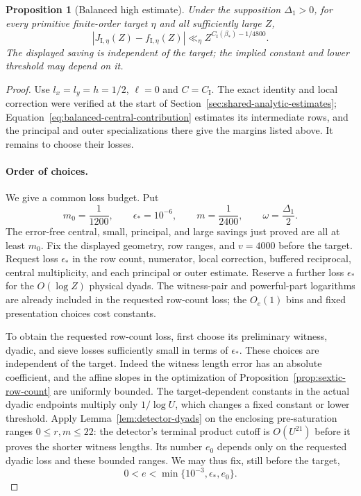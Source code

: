\documentclass[11pt,a4paper]{article}
\numberwithin{equation}{section}
\numberwithin{figure}{section}
\newtheorem{proposition}[theorem]{Proposition}
\theoremstyle{definition}
\theoremstyle{remark}
\begin{document}
\begin{proposition}[Balanced high estimate]
\label{prop:balanced-high}
Under the supposition $\Delta_1>0$, for every primitive finite-order target
$\eta$ and all sufficiently large $Z$,
\[
 |J_{\mathrm I,\eta}(Z)-f_{\mathrm I,\eta}(Z)|
 \ll_\eta Z^{C_{\mathrm I}(\beta_*)-1/4800}.
\]
The displayed saving is independent of the target; the implied constant and
lower threshold may depend on it.
\end{proposition}

\begin{proof}
Use $l_x=l_y=h=1/2$, $\ell=0$ and $C=C_{\mathrm I}$.
The exact identity and local correction were verified at the start of
Section~\ref{sec:shared-analytic-estimates};
Equation~\eqref{eq:balanced-central-contribution} estimates its intermediate
rows, and the principal and outer specializations there give the margins
listed above.  It remains to choose their losses.

\paragraph{Order of choices.}
We give a common loss budget.  Put
\[
 m_0=\frac1{1200},\qquad \epsilon_*=10^{-6},\qquad
 m=\frac1{2400},\qquad \omega=\frac{\Delta_1}{2}.
\]
The error-free central, small, principal, and large savings just proved are
all at least $m_0$.  Fix the displayed geometry, row ranges, and $v=4000$
before the target.  Request loss $\epsilon_*$ in the row count, numerator,
local correction, buffered reciprocal, central multiplicity, and each
principal or outer estimate.  Reserve a further loss $\epsilon_*$ for the
$O(\log Z)$ physical dyads.  The witness-pair and powerful-part logarithms
are already included in the requested row-count loss; the $O_e(1)$ bins
and fixed presentation choices cost constants.

To obtain the requested row-count loss, first choose its preliminary witness,
dyadic, and sieve losses sufficiently small in terms of $\epsilon_*$.
These choices are independent of the target.  Indeed the witness length
error has an absolute coefficient, and the affine slopes in the optimization
of Proposition~\ref{prop:sextic-row-count} are uniformly bounded.  The
target-dependent constants in the actual dyadic endpoints multiply only
$1/\log U$, which changes a fixed constant or lower threshold.  Apply
Lemma~\ref{lem:detector-dyads} on the enclosing pre-saturation ranges
$0\le r,m\le22$: the detector's terminal product cutoff is $O(U^{21})$
before it proves the shorter witness lengths.  Its number $e_0$ depends
only on the requested dyadic loss and these bounded ranges.  We may thus
fix, still before the target,
\[
 0<e<\min\{10^{-3},\epsilon_*,e_0\}.
\]


\end{proof}
\end{document}
